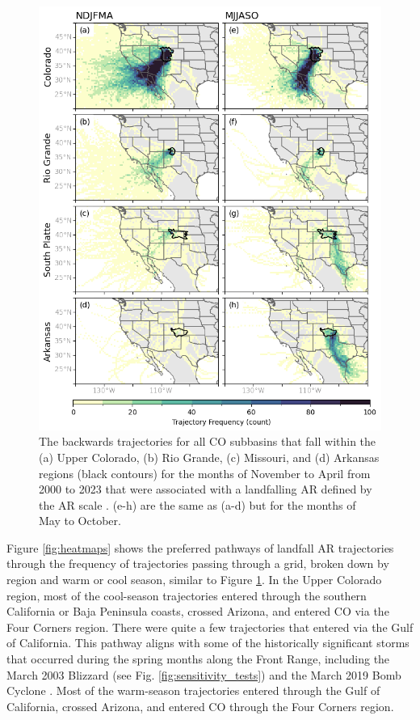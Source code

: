 \documentclass[draft]{agujournal2019}
\begin{document}
\begin{figure}
\noindent\includegraphics[width=\textwidth, height=\textheight, keepaspectratio]{fig4.png}
\caption{The backwards trajectories for all CO subbasins that fall within the (a) Upper Colorado, (b) Rio Grande, (c) Missouri, and (d) Arkansas regions (black contours) for the months of November to April from 2000 to 2023 that were associated with a landfalling AR defined by the AR scale \cite{MartinRalph2019}. (e-h) are the same as (a-d) but for the months of May to October. }
\label{fig:spaghetti_plot}
\end{figure}


Figure \ref{fig:heatmaps} shows the preferred pathways of landfall AR trajectories through the frequency of trajectories passing through a grid, broken down by region and warm or cool season, similar to Figure \ref{fig:spaghetti_plot}. In the Upper Colorado region, most of the cool-season trajectories entered through the southern California or Baja Peninsula coasts, crossed Arizona, and entered CO via the Four Corners region. There were quite a few trajectories that entered via the Gulf of California. This pathway aligns with some of the historically significant storms that occurred during the spring months along the Front Range, including the March 2003 Blizzard (see Fig. \ref{fig:sensitivity_tests}) and the March 2019 Bomb Cyclone \cite{Zou2025A2019}. Most of the warm-season trajectories entered through the Gulf of California, crossed Arizona, and entered CO through the Four Corners region. 
\end{document}
